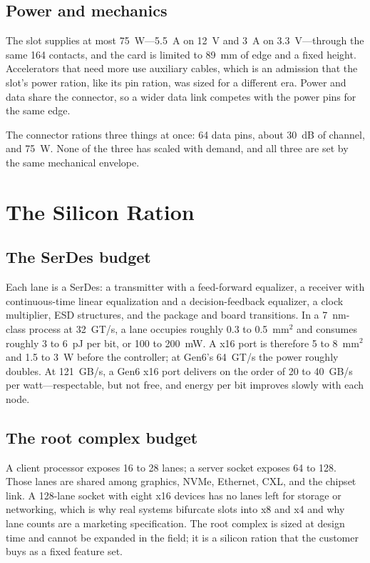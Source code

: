 \documentclass[10pt,letterpaper]{article}
\begin{document}
\subsection{Power and mechanics}

The slot supplies at most 75~W---5.5~A on 12~V and 3~A on 3.3~V---through the same 164 contacts, and the card is limited to 89~mm of edge and a fixed height. Accelerators that need more use auxiliary cables, which is an admission that the slot's power ration, like its pin ration, was sized for a different era. Power and data share the connector, so a wider data link competes with the power pins for the same edge.

The connector rations three things at once: 64 data pins, about 30~dB of channel, and 75~W. None of the three has scaled with demand, and all three are set by the same mechanical envelope.

\section{The Silicon Ration}
\label{sec:silicon}

\subsection{The SerDes budget}

Each lane is a SerDes: a transmitter with a feed-forward equalizer, a receiver with continuous-time linear equalization and a decision-feedback equalizer, a clock multiplier, ESD structures, and the package and board transitions. In a 7~nm-class process at 32~GT/s, a lane occupies roughly 0.3 to 0.5~mm$^2$ and consumes roughly 3 to 6~pJ per bit, or 100 to 200~mW. A x16 port is therefore 5 to 8~mm$^2$ and 1.5 to 3~W before the controller; at Gen6's 64~GT/s the power roughly doubles. At 121~GB/s, a Gen6 x16 port delivers on the order of 20 to 40~GB/s per watt---respectable, but not free, and energy per bit improves slowly with each node.

\subsection{The root complex budget}

A client processor exposes 16 to 28 lanes; a server socket exposes 64 to 128. Those lanes are shared among graphics, NVMe, Ethernet, CXL, and the chipset link. A 128-lane socket with eight x16 devices has no lanes left for storage or networking, which is why real systems bifurcate slots into x8 and x4 and why lane counts are a marketing specification. The root complex is sized at design time and cannot be expanded in the field; it is a silicon ration that the customer buys as a fixed feature set.
\end{document}
